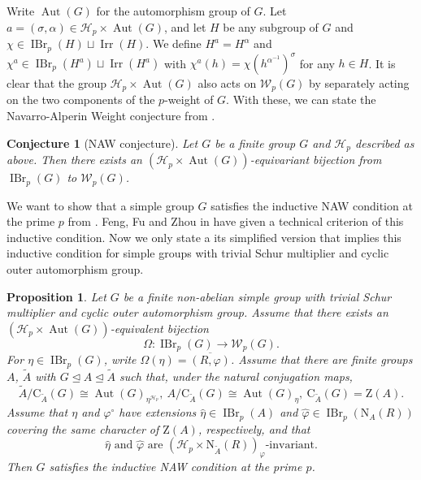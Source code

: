 \documentclass[11pt,a4paper]{article}
\numberwithin{equation}{section}
\newtheorem{proposition}[theorem]{Proposition}
\newtheorem{conjecture}[theorem]{Conjecture}
\theoremstyle{definition}
\theoremstyle{remark}
\newcommand{\Irr}{\operatorname{Irr}}
\newcommand{\IBr}{\operatorname{IBr}}
\newcommand{\Aut}{\operatorname{Aut}}
\newcommand{\ZZ}{\mathrm{Z}}
\newcommand{\HH}{\mathcal H}
\newcommand{\WW}{\mathcal W}
\newcommand{\NN}{\mathrm N}
\newcommand{\CC}{\mathrm C}
\begin{document}
Write $\Aut(G)$ for the automorphism group of $G$. Let $a=(\sigma,\alpha)\in\HH_p\times\Aut(G)$, and let $H$ be 
any subgroup of $G$ and $\chi\in \IBr_p(H)\sqcup\Irr(H)$.
We define $H^a=H^\alpha$ and $\chi^a\in\IBr_p(H^a)\sqcup \Irr(H^a)$
with $\chi^a(h)=\chi(h^{\alpha^{-1}})^\sigma$ for any $h\in H$. 
It is clear that the group $\HH_p\times\Aut(G)$ also acts on $\WW_p(G)$ by separately acting on the two components of the $p$-weight of $G$. With these, we can state the Navarro-Alperin Weight conjecture from \cite{FFZ}.
\begin{conjecture}[{NAW conjecture}]\label{con2.1}
Let $G$ be a finite group $G$ and $\HH_p$  described as above. Then there exists an $(\HH_p\times \Aut(G))$-equivariant bijection from $\IBr_p(G)$ to $\WW_p(G)$.    
\end{conjecture}

We want to show that a simple group $G$ satisfies the inductive NAW condition at the prime $p$ from \cite[Definition 7.1]{FFZ}. Feng, Fu and Zhou in \cite[Proposition 9.1]{FFZ} have given a technical criterion of this inductive condition. Now we only state a its simplified version that implies this inductive  condition for simple groups with trivial Schur multiplier and cyclic outer automorphism group.
\begin{proposition}\label{prop:criterion}
Let \(G\) be a finite non-abelian simple group  with
trivial Schur multiplier and cyclic outer automorphism group. 
Assume that there exists an \((\HH_p\times\Aut(G))\)-equivalent bijection
\begin{equation}\label{equ:bijection}
 \Omega:\IBr_p(G)\longrightarrow\WW_p(G).
\end{equation}
For \(\eta\in\IBr_p(G)\), write
\(\Omega(\eta)=\overline{(R,\varphi)}\).
Assume that there are finite groups $A$, $\widetilde A$ with \(G\unlhd A\unlhd\widetilde A\) such that, under the natural
conjugation maps,
\begin{equation*}
 \widetilde A/\CC_{\widetilde A}(G)\cong\Aut(G)_{\eta^{\HH_p}},\
 A/\CC_{\widetilde A}(G)\cong\Aut(G)_\eta,\ 
 \CC_{\widetilde A}(G)=\ZZ(A).
\end{equation*}
Assume that  \(\eta\) and \(\varphi^\circ\) have extensions $\widehat\eta\in\IBr_p(A)$ and 
$\widehat\varphi\in\IBr_p(\NN_A(R))$
covering the same character of \(\ZZ(A)\), respectively, and that
\begin{equation}\label{extension criterion}
\text{$\widehat \eta$ and $\widehat \varphi$ are $(\HH_p\times\NN_{\widetilde A}(R))_{\varphi}$-invariant}.
\end{equation}
Then \(G\) satisfies the inductive NAW condition at  the prime \(p\).
\end{proposition}
\end{document}

